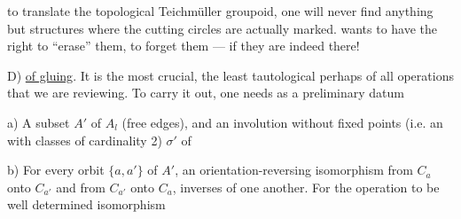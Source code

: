 to  translate the topological Teichmüller groupoid, one will never find anything but structures where the cutting circles are actually marked.
 wants to have the right to ``erase'' them, to forget them  ---  if they are indeed there!

D) \uline{ of gluing}. It is the most crucial, the least tautological perhaps of all  operations that we are reviewing.
To carry it out, one needs as a preliminary datum

a) A subset  $A'$ of $A_l$ (free edges), and an involution without fixed points (i.e. an   with classes of cardinality 2) $\sigma'$ of  

b) For  every orbit  $\{a,a'\}$ of $A'$, an orientation-reversing isomorphism from $C_a$ onto $C_{a'}$ and from $C_{a'}$ onto $C_a$, inverses of one another.
For the operation to be well determined   isomorphism
